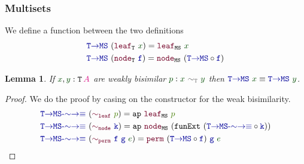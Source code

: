 \documentclass[xelatex,mathserif,serif,notheorems]{beamer} %
\theoremstyle{plain} %
\newtheorem{lem}[thm]{Lemma}
\theoremstyle{definition}
\theoremstyle{remark}
\newcommand*{\term}[1]{\textcolor{green!30!black}{#1}} %
\newcommand*{\pathterm}[1]{\textcolor{green!65!red!75!black}{#1}}
\newcommand*{\type}[1]{\textcolor{magenta!90!black}{#1}}
\newcommand*{\relation}[1]{\textcolor{gray!75!black}{\ensuremath{\mathtt{#1}}}}
\newcommand*{\function}[1]{\textcolor{blue!60!black}{\ensuremath{\mathtt{#1}}}}
\newcommand*{\constructor}[1]{\textcolor{purple!60!black}{\ensuremath{\mathtt{#1}}}}
\newcommand*{\typeformer}[1]{\ensuremath{\mathtt{#1}}}
\newcommand{\setlengths}{
  \setlength{\abovedisplayskip}{4pt}
  \setlength{\belowdisplayskip}{4pt}
  \setlength{\abovedisplayshortskip}{2pt}
  \setlength{\belowdisplayshortskip}{2pt}
}
\begin{document}
\begin{frame}
  \frametitle{Multisets}
  We define a function between the two definitions
    \begin{equation}
    \begin{aligned}
      &\function{T{\rightarrow}MS}~(\constructor{leaf}_{\typeformer{T}}~\term{x}) = \constructor{leaf}_{\typeformer{MS}}~\term{x} \\
      &\function{T{\rightarrow}MS}~(\constructor{node}_{\typeformer{T}}~\function{f}) = \constructor{node}_{\typeformer{MS}}~(\function{T{\rightarrow}MS} \circ \function{f})
    \end{aligned}
  \end{equation}
  \begin{lem}
    If \(\term{x}, \term{y} : \typeformer{T}\,\type{A}\) are weakly bisimilar \(\term{p} : \term{x}~\relation{\sim_{T}}~\term{y}\) then \(\function{T{\rightarrow}MS}~\term{x} \equiv \function{T{\rightarrow}MS}~\term{y}\).
  \end{lem}
  \begin{proof}\setlengths
    We do the proof by casing on the constructor for the weak bisimilarity.
    \begin{equation}
      \begin{aligned}
        &\function{T{\rightarrow}MS\text{-}{\sim}{\rightarrow}{\equiv}}~(\constructor{\sim_{leaf}}~\pathterm{p}) = \mathtt{ap}~\constructor{leaf}_{\typeformer{MS}}~\pathterm{p} \\
        &\function{T{\rightarrow}MS\text{-}{\sim}{\rightarrow}{\equiv}}~(\constructor{\sim_{node}}~\function{k}) = \mathtt{ap}~\constructor{node}_{\typeformer{MS}}~(\mathtt{funExt}~(\function{T{\rightarrow}MS\text{-}{\sim}{\rightarrow}{\equiv}} \circ \function{k})) \\
        &\function{T{\rightarrow}MS\text{-}{\sim}{\rightarrow}{\equiv}}~(\constructor{\sim_{perm}}~\function{f}~\function{g}~\term{e}) = \constructor{perm}~(\function{T{\rightarrow}MS} \circ \function{f})~\function{g}~\term{e}
      \end{aligned}
    \end{equation}
  \end{proof}
\end{frame}
\end{document}
